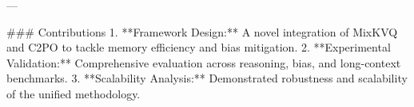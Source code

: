 ---

### Contributions
1. **Framework Design:** A novel integration of MixKVQ and C2PO to tackle memory efficiency and bias mitigation.
2. **Experimental Validation:** Comprehensive evaluation across reasoning, bias, and long-context benchmarks.
3. **Scalability Analysis:** Demonstrated robustness and scalability of the unified methodology.

